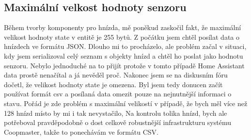 \subsection*{Maximální velkost hodnoty senzoru}
Během tvorby komponenty pro hnízda, mě poněkud zaskočil fakt, že maximální velikost hodnoty state v entitě je 255 bytů.
Z počátku jsem chtěl posílat data o hnízdech ve formátu JSON.
Dlouho mi to procházelo, ale problém začal v situaci, kdy jsem serializoval celý seznam s objekty hnízd a chtěl ho poslat jako hodnotu senzoru.
Nebylo jednoduché na to přijít protože v tomto případě Home Assistant data prostě nenačítal a já nevěděl proč.
Nakonec jsem se na diskusním fóru dočetl, že velikost hodnoty state je omezena.
Byl jsem tedy donucen začít používat formát csv a posílaná data omezit pouze na nejnutnější informaci o stavu.
Pořád je zde problém s maximální velikostí v případě, že bych měl více než 128 hnízd místo by mi i tak nevystačilo,
Na kontrolu tolika hnízd, bych ale potřeboval pravděpodobně o dost celkově robustnější infrastrukturu systému Coopmaster, takže to ponechávám ve formátu CSV.




